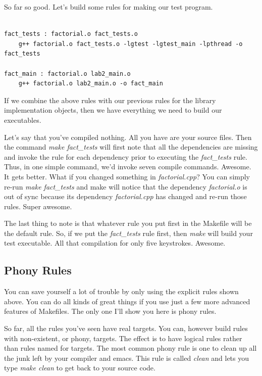 \documentclass[]{tufte-handout}
\begin{document}
So far so good. Let's build some rules for making our test program.  
\begin{verbatim}

fact_tests : factorial.o fact_tests.o
    g++ factorial.o fact_tests.o -lgtest -lgtest_main -lpthread -o fact_tests
    
fact_main : factorial.o lab2_main.o
    g++ factorial.o lab2_main.o -o fact_main
\end{verbatim}
If we combine the above rules with our previous rules for the library implementation objects, then we have everything we need to build our executables.  

Let's say that you've compiled nothing. All you have are your source files. Then the command \textit{make fact\_tests} will first note that all the dependencies are missing and invoke the rule for each dependency prior to executing the \textit{fact\_tests} rule. Thus, in one simple command, we'd invoke seven compile commands. Awesome. It gets better. What if you changed something in \textit{factorial.cpp}? You can simply re-run \textit{make fact\_tests} and make will notice that the dependency \textit{factorial.o} is out of sync because its dependency \textit{factorial.cpp} has changed and re-run those rules. Super awesome.

The last thing to note is that whatever rule you put first in the Makefile will be the default rule. So, if we put the \textit{fact\_tests} rule first, then \textit{make} will build your test executable. All that compilation for only five keystrokes. Awesome.  

\subsection{Phony Rules}

You can save yourself a lot of trouble by only using the explicit rules shown above. You can do all kinds of great things if you use just a few more advanced features of Makefiles. The only one I'll show you here is phony rules.  

So far, all the rules you've seen have real targets.  You can, however build rules with non-existent, or phony, targets.  The effect is to have logical rules rather than rules named for targets. The most common phony rule is one to clean up all the junk left by your compiler and emacs. This rule is called \textit{clean} and lets you type \textit{make clean} to get back to your source code.
\end{document}
